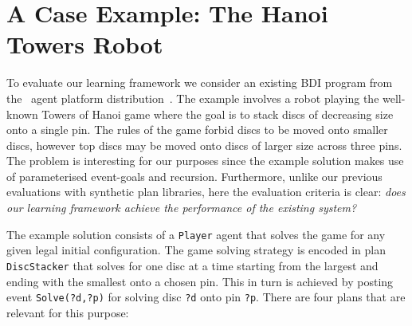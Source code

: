 \section{A Case Example: The Hanoi Towers Robot}\label{sec:hanoi}

\newcommand{\entity}[1]{\texttt{#1}}

To evaluate our learning framework we consider an existing BDI program
from the \JACK\ agent platform
distribution~\cite{BusettaRHL:AL99-JACK}.
The example involves a robot playing the well-known Towers of Hanoi game where the goal is to stack discs of decreasing size onto a single pin. The rules of the game forbid discs to be moved onto smaller discs, however top discs may be moved onto discs of larger size across three pins. The problem is interesting for our purposes since the example solution makes use of parameterised event-goals and recursion. Furthermore, unlike our previous evaluations \cite{Airiau:IJAT:09,Singh:AAMAS10} with synthetic plan libraries, here the evaluation criteria is clear: \emph{does our learning framework achieve the performance of the existing system?}


The example solution consists of a \entity{Player} agent that solves the game for 
any given legal initial configuration. The game solving strategy is encoded in plan
\entity{DiscStacker} that solves for one disc at a time starting from the largest
and ending with the smallest onto a chosen pin. This in turn is achieved by posting 
event \entity{Solve(?d,?p)} for solving disc \entity{?d} 
onto pin \entity{?p}. There are four plans that are relevant for this purpose:
%

